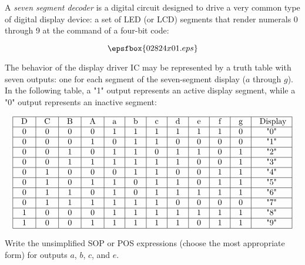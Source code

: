 

A {\it seven segment decoder} is a digital circuit designed to drive a very common type of digital display device: a set of LED (or LCD) segments that render numerals 0 through 9 at the command of a four-bit code:

$$\epsfbox{02824x01.eps}$$

The behavior of the display driver IC may be represented by a truth table with seven outputs: one for each segment of the seven-segment display ($a$ through $g$).  In the following table, a "1" output represents an active display segment, while a "0" output represents an inactive segment:


$$\vbox{\offinterlineskip
\halign{\strut
\vrule \quad\hfil # \ \hfil & 
\vrule \quad\hfil # \ \hfil & 
\vrule \quad\hfil # \ \hfil & 
\vrule \quad\hfil # \ \hfil & 
\vrule \quad\hfil # \ \hfil & 
\vrule \quad\hfil # \ \hfil & 
\vrule \quad\hfil # \ \hfil & 
\vrule \quad\hfil # \ \hfil & 
\vrule \quad\hfil # \ \hfil & 
\vrule \quad\hfil # \ \hfil & 
\vrule \quad\hfil # \ \hfil & 
\vrule \quad\hfil # \ \hfil \vrule \cr
\noalign{\hrule}
%
D & C & B & A & a & b & c & d & e & f & g & Display\cr
%
\noalign{\hrule}
%
0 & 0 & 0 & 0 & 1 & 1 & 1 & 1 & 1 & 1 & 0 & "0" \cr
%
\noalign{\hrule}
%
0 & 0 & 0 & 1 & 0 & 1 & 1 & 0 & 0 & 0 & 0 & "1" \cr
%
\noalign{\hrule}
%
0 & 0 & 1 & 0 & 1 & 1 & 0 & 1 & 1 & 0 & 1 & "2" \cr
%
\noalign{\hrule}
%
0 & 0 & 1 & 1 & 1 & 1 & 1 & 1 & 0 & 0 & 1 & "3" \cr
%
\noalign{\hrule}
%
0 & 1 & 0 & 0 & 0 & 1 & 1 & 0 & 0 & 1 & 1 & "4" \cr
%
\noalign{\hrule}
%
0 & 1 & 0 & 1 & 1 & 0 & 1 & 1 & 0 & 1 & 1 & "5" \cr
%
\noalign{\hrule}
%
0 & 1 & 1 & 0 & 1 & 0 & 1 & 1 & 1 & 1 & 1 & "6" \cr
%
\noalign{\hrule}
%
0 & 1 & 1 & 1 & 1 & 1 & 1 & 0 & 0 & 0 & 0 & "7" \cr
%
\noalign{\hrule}
%
1 & 0 & 0 & 0 & 1 & 1 & 1 & 1 & 1 & 1 & 1 & "8" \cr
%
\noalign{\hrule}
%
1 & 0 & 0 & 1 & 1 & 1 & 1 & 1 & 0 & 1 & 1 & "9" \cr
%
\noalign{\hrule}
} %
}$$ %

Write the unsimplified SOP or POS expressions (choose the most appropriate form) for outputs $a$, $b$, $c$, and $e$.

